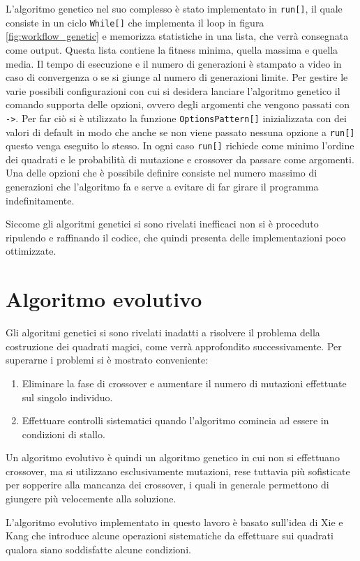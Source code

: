 \documentclass[italian,twoside,twocolumn]{article}
\begin{document}
L'algoritmo genetico nel suo complesso è stato implementato in \texttt{run[]}, il quale consiste in un ciclo \texttt{While[]} che implementa il loop in figura \ref{fig:workflow_genetic} e memorizza statistiche in una lista, che verrà consegnata come output. Questa lista contiene la fitness minima, quella massima e quella media. Il tempo di esecuzione e il numero di generazioni è stampato a video in caso di convergenza o se si giunge al numero di generazioni limite.  Per gestire le varie possibili configurazioni con cui si desidera lanciare l'algoritmo genetico il comando supporta delle opzioni, ovvero degli argomenti che vengono passati con \texttt{->}. Per far ciò si è utilizzato la funzione \texttt{OptionsPattern[]} inizializzata con dei valori di default in modo che anche se non viene passato nessuna opzione a \texttt{run[]} questo venga eseguito lo stesso. In ogni caso \texttt{run[]} richiede come minimo l'ordine dei quadrati e le probabilità di mutazione e crossover da passare come argomenti. Una delle opzioni che è possibile definire consiste nel numero massimo di generazioni che l'algoritmo fa e serve a evitare di far girare il programma indefinitamente. 

Siccome gli algoritmi genetici si sono rivelati inefficaci non si è proceduto ripulendo e raffinando il codice, che quindi presenta delle implementazioni poco ottimizzate.

\section{Algoritmo evolutivo}
Gli algoritmi genetici si sono rivelati inadatti a risolvere il problema della costruzione dei quadrati magici, come verrà approfondito successivamente. Per superarne i problemi si è mostrato conveniente:
\begin{enumerate}
	\item Eliminare la fase di crossover e aumentare il numero di mutazioni effettuate sul singolo individuo.
	\item Effettuare controlli sistematici quando l'algoritmo comincia ad essere in condizioni di stallo.
\end{enumerate}
Un algoritmo evolutivo è quindi un algoritmo genetico in cui non si effettuano crossover, ma si utilizzano esclusivamente mutazioni, rese tuttavia più sofisticate per sopperire alla mancanza dei crossover, i quali in generale permettono di giungere più velocemente alla soluzione. 

L'algoritmo evolutivo implementato in questo lavoro è basato sull'idea di Xie e Kang \cite{XieKang:2003} che introduce alcune operazioni sistematiche da effettuare sui quadrati qualora siano soddisfatte alcune condizioni.
\end{document}
